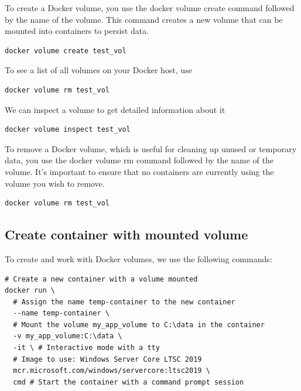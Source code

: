 \documentclass{article}
\begin{document}
To create a Docker volume, you use the docker volume create command followed by the name of the volume. This command creates a new volume that can be mounted into containers to persist data.

\begin{lstlisting}
docker volume create test_vol
\end{lstlisting}

To see a list of all volumes on your Docker host, use
\begin{lstlisting}
docker volume rm test_vol
\end{lstlisting}

We can inspect a volume to get detailed information about it
\begin{lstlisting}
docker volume inspect test_vol
\end{lstlisting}

To remove a Docker volume, which is useful for cleaning up unused or temporary data, you use the docker volume rm command followed by the name of the volume. It's important to ensure that no containers are currently using the volume you wish to remove.
\begin{lstlisting}
docker volume rm test_vol
\end{lstlisting}

\subsection{Create container with mounted volume}
To create and work with Docker volumes, we use the following commands:

\begin{lstlisting}
# Create a new container with a volume mounted
docker run \
  # Assign the name temp-container to the new container
  --name temp-container \
  # Mount the volume my_app_volume to C:\data in the container
  -v my_app_volume:C:\data \ 
  -it \ # Interactive mode with a tty
  # Image to use: Windows Server Core LTSC 2019
  mcr.microsoft.com/windows/servercore:ltsc2019 \
  cmd # Start the container with a command prompt session
\end{lstlisting}
\end{document}
